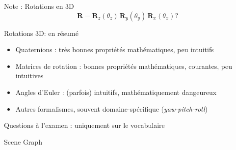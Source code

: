 \documentclass[compress]{beamer}
\begin{document}
\begin{frame}{Note : Rotations en 3D}
{\[
    \mathbf{R} = \mathbf{R}_z(\theta_z) \, \mathbf{R}_y(\theta_y) \,
    \mathbf{R}_x(\theta_x) ?
\]
}


\end{frame}

\begin{frame}{Rotations 3D: en résumé}
    \begin{itemize}
        \item {\Medium Quaternions} : très bonnes propriétés mathématiques, peu
            intuitifs
        \item {\Medium Matrices de rotation} : bonnes propriétés mathématiques, courantes,
            peu intuitives
        \item {\Medium Angles d'Euler} : (parfois) intuitifs, mathématiquement dangeureux
        \item Autres formalismes, souvent domaine-spécifique
            (\emph{yaw-pitch-roll})
    \end{itemize}

    {\Medium Questions à l'examen : uniquement sur le vocabulaire}
\end{frame}

\begin{frame}{Scene Graph}
    \begin{center}

    \end{center}
\end{frame}
\end{document}
